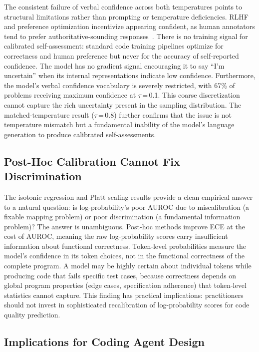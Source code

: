 \documentclass{article}
\begin{document}
The consistent failure of verbal confidence across both temperatures points to structural limitations rather than prompting or temperature deficiencies. RLHF and preference optimization incentivize appearing confident, as human annotators tend to prefer authoritative-sounding responses~\citep{tian2023just}. There is no training signal for calibrated self-assessment: standard code training pipelines optimize for correctness and human preference but never for the accuracy of self-reported confidence. The model has no gradient signal encouraging it to say ``I'm uncertain'' when its internal representations indicate low confidence. Furthermore, the model's verbal confidence vocabulary is severely restricted, with 67\% of problems receiving maximum confidence at $\tau$\,=\,0.1. This coarse discretization cannot capture the rich uncertainty present in the sampling distribution. The matched-temperature result ($\tau$\,=\,0.8) further confirms that the issue is not temperature mismatch but a fundamental inability of the model's language generation to produce calibrated self-assessments.

\subsection{Post-Hoc Calibration Cannot Fix Discrimination}
\label{sec:posthoc_disc}

The isotonic regression and Platt scaling results provide a clean empirical answer to a natural question: is log-probability's poor AUROC due to miscalibration (a fixable mapping problem) or poor discrimination (a fundamental information problem)? The answer is unambiguous. Post-hoc methods improve ECE at the cost of AUROC, meaning the raw log-probability scores carry insufficient information about functional correctness. Token-level probabilities measure the model's confidence in its token choices, not in the functional correctness of the complete program. A model may be highly certain about individual tokens while producing code that fails specific test cases, because correctness depends on global program properties (edge cases, specification adherence) that token-level statistics cannot capture. This finding has practical implications: practitioners should not invest in sophisticated recalibration of log-probability scores for code quality prediction.

\subsection{Implications for Coding Agent Design}
\label{sec:implications}
\end{document}

